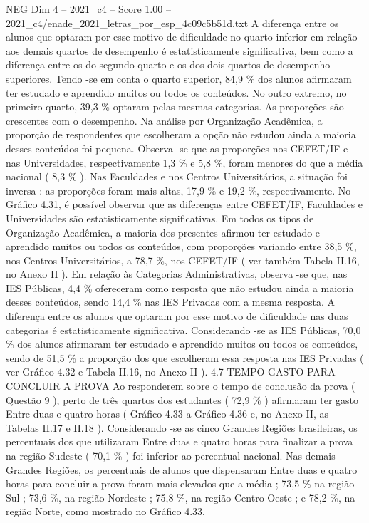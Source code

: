 \begin{textsample}{NEG Dim 4 – 2021\_c4 – Score 1.00 – 2021\_c4/enade\_2021\_letras\_por\_esp\_4c09c5b51d.txt}
A diferença entre os alunos que optaram por esse motivo de dificuldade no quarto inferior em relação aos demais quartos de desempenho é estatisticamente significativa, bem como a diferença entre os do segundo quarto e os dos dois quartos de desempenho superiores.
Tendo -se em conta o quarto superior, 84,9 \% dos alunos afirmaram ter estudado e aprendido muitos ou todos os conteúdos.
No outro extremo, no primeiro quarto, 39,3 \% optaram pelas mesmas categorias.
As proporções são crescentes com o desempenho.
Na análise por Organização Acadêmica, a proporção de respondentes que escolheram a opção não estudou ainda a maioria desses conteúdos foi pequena.
Observa -se que as proporções nos CEFET/IF e nas Universidades, respectivamente 1,3 \% e 5,8 \%, foram menores do que a média nacional ( 8,3 \% ).
Nas Faculdades e nos Centros Universitários, a situação foi inversa : as proporções foram mais altas, 17,9 \% e 19,2 \%, respectivamente.
No Gráfico 4.31, é possível observar que as diferenças entre CEFET/IF, Faculdades e Universidades são estatisticamente significativas.
Em todos os tipos de Organização Acadêmica, a maioria dos presentes afirmou ter estudado e aprendido muitos ou todos os conteúdos, com proporções variando entre 38,5 \%, nos Centros Universitários, a 78,7 \%, nos CEFET/IF ( ver também Tabela II.16, no Anexo II ).
Em relação às Categorias Administrativas, observa -se que, nas IES Públicas, 4,4 \% ofereceram como resposta que não estudou ainda a maioria desses conteúdos, sendo 14,4 \% nas IES Privadas com a mesma resposta.
A diferença entre os alunos que optaram por esse motivo de dificuldade nas duas categorias é estatisticamente significativa.
Considerando -se as IES Públicas, 70,0 \% dos alunos afirmaram ter estudado e aprendido muitos ou todos os conteúdos, sendo de 51,5 \% a proporção dos que escolheram essa resposta nas IES Privadas ( ver Gráfico 4.32 e Tabela II.16, no Anexo II ). 4.7 TEMPO GASTO PARA CONCLUIR A PROVA Ao responderem sobre o tempo de conclusão da prova ( Questão 9 ), perto de três quartos dos estudantes ( 72,9 \% ) afirmaram ter gasto Entre duas e quatro horas ( Gráfico 4.33 a Gráfico 4.36 e, no Anexo II, as Tabelas II.17 e II.18 ).
Considerando -se as cinco Grandes Regiões brasileiras, os percentuais dos que utilizaram Entre duas e quatro horas para finalizar a prova na região Sudeste ( 70,1 \% ) foi inferior ao percentual nacional.
Nas demais Grandes Regiões, os percentuais de alunos que dispensaram Entre duas e quatro horas para concluir a prova foram mais elevados que a média ; 73,5 \% na região Sul ; 73,6 \%, na região Nordeste ; 75,8 \%, na região Centro-Oeste ; e 78,2 \%, na região Norte, como mostrado no Gráfico 4.33.

\end{textsample}
